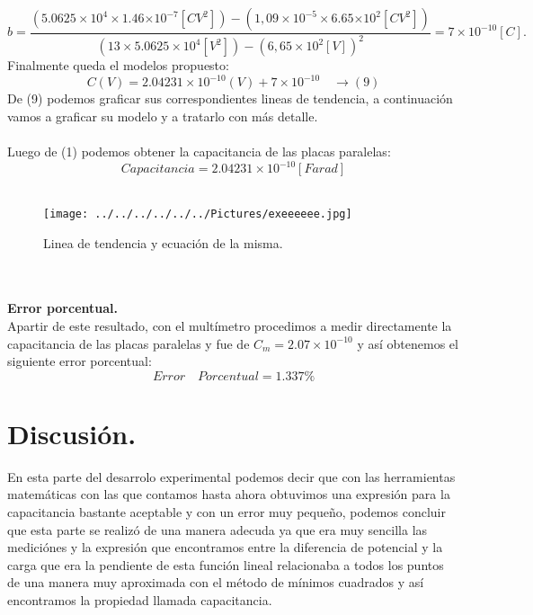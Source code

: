\documentclass[11pt,a4paper]{article}
\begin{document}
{\[ { b }=\frac { (5.0625\times { 10 }^{ 4 }\times 1.46{ \times 10 }^{ -7 }\left[ { C{ V }^{ 2 } } \right] )-(1,09\times { 10 }^{ -5 }\times 6.65{ \times 10 }^{ 2 }\left[ { C{ V }^{ 2 } } \right] ) }{ (13\times 5.0625\times { 10 }^{ 4 }\left[ { V }^{ 2 } \right] )-{ \left( 6,65\times { 10 }^{ 2 }\left[ {V  } \right]  \right)  }^{ 2 } } = 7\times { 10 }^{ -10 }\left[ { C }  \right] .\]
Finalmente queda el modelos propuesto:
\[ C(V)= 2.04231\times {10}^{ -10 }(V) + 7\times { 10 }^{ -10 } \quad \rightarrow (9) \]
De (9) podemos graficar sus correspondientes lineas de tendencia, a continuaci\'{o}n vamos a graficar su modelo y a tratarlo con m\'{a}s detalle.
\\ 
\\
 Luego de (1) podemos obtener la capacitancia de las placas paralelas: 
\[Capacitancia = 2.04231\times {10}^{ -10 } \left[ { Farad } \right] \]
\\
\begin{figure}[hbtp]
\centering
\texttt{[image: ../../../../../../Pictures/exeeeeee.jpg]}
\caption{Linea de tendencia y ecuaci\'{o}n de la misma. }
\end{figure}
\\
\\
\textbf{Error porcentual.}\\
Apartir de este resultado, con el mult\'{i}metro procedimos a medir directamente la capacitancia de las placas paralelas y fue de ${C}_{m} = 2.07\times {10}^{-10}$ y as\'{i} obtenemos el siguiente error porcentual: 
\[Error \quad Porcentual = 1.337 \% \]

\section*{Discusi\'{o}n.}
En esta parte del desarrolo experimental podemos decir que con las herramientas matem\'{a}ticas con las que contamos hasta ahora obtuvimos una expresi\'{o}n para la capacitancia bastante aceptable y con un error muy peque\~{n}o, podemos concluir que esta parte se realiz\'{o} de una manera adecuda ya que era muy sencilla las medici\'{o}nes y la expresi\'{o}n que encontramos entre la diferencia de potencial y la carga que era la pendiente de esta funci\'{o}n lineal relacionaba a todos los puntos de una manera muy aproximada con el m\'{e}todo de m\'{i}nimos cuadrados y as\'{i} encontramos la propiedad llamada capacitancia. 

\pagebreak

}
\end{document}
